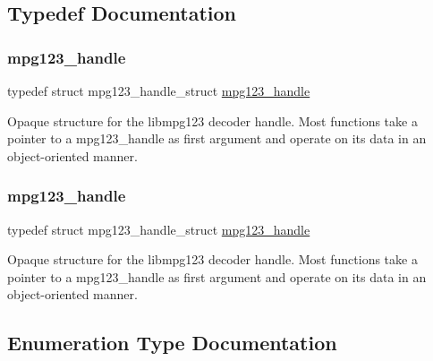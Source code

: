 \subsection{Typedef Documentation}
\mbox{\label{group__mpg123__init_ga6728e2839a395f3a07d4514da659faca}} 
\subsubsection{\texorpdfstring{mpg123\+\_\+handle}{mpg123\_handle}\hspace{0.1cm}{\footnotesize\ttfamily [1/2]}}
{\footnotesize\ttfamily typedef struct mpg123\+\_\+handle\+\_\+struct \hyperlink{group__mpg123__init_ga6728e2839a395f3a07d4514da659faca}{mpg123\+\_\+handle}}

Opaque structure for the libmpg123 decoder handle. Most functions take a pointer to a mpg123\+\_\+handle as first argument and operate on its data in an object-\/oriented manner. \mbox{\label{group__mpg123__init_ga6728e2839a395f3a07d4514da659faca}} 
\subsubsection{\texorpdfstring{mpg123\+\_\+handle}{mpg123\_handle}\hspace{0.1cm}{\footnotesize\ttfamily [2/2]}}
{\footnotesize\ttfamily typedef struct mpg123\+\_\+handle\+\_\+struct \hyperlink{group__mpg123__init_ga6728e2839a395f3a07d4514da659faca}{mpg123\+\_\+handle}}

Opaque structure for the libmpg123 decoder handle. Most functions take a pointer to a mpg123\+\_\+handle as first argument and operate on its data in an object-\/oriented manner. 

\subsection{Enumeration Type Documentation}
\mbox{\label{group__mpg123__init_gab26f1b8c3289847f5928176a20b4c942}} 
